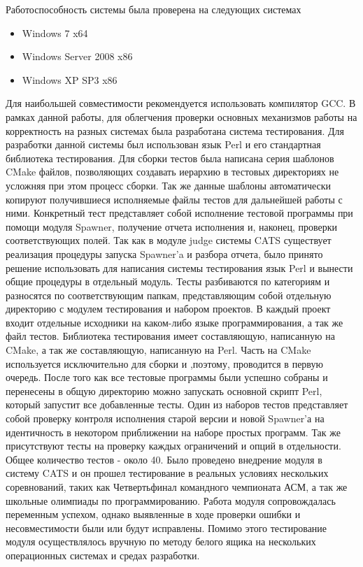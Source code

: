 \documentclass{imcs}
\begin{document}
Работоспособность системы была проверена на следующих системах
\begin{itemize}

	\item Windows 7 x64
	\item Windows Server 2008 x86
	\item Windows XP SP3 x86
\end{itemize}
Для наибольшей совместимости рекомендуется использовать компилятор GCC.
В рамках данной работы, для облегчения проверки основных механизмов работы на корректность на разных системах была разработана система тестирования.
Для разработки данной системы был использован язык Perl и его стандартная библиотека тестирования. Для сборки тестов была написана серия шаблонов CMake файлов, позволяющих создавать иерархию в тестовых директориях не усложняя при этом процесс сборки. Так же данные шаблоны автоматически копируют получившиеся исполняемые файлы тестов для дальнейшей работы с ними.
Конкретный тест представляет собой исполнение тестовой программы при помощи модуля Spawner, получение отчета исполнения и, наконец, проверки соответствующих полей. Так как в модуле judge системы CATS существует реализация процедуры запуска Spawner'a и разбора отчета, было принято решение использовать для написания системы тестирования язык Perl и вынести общие процедуры в отдельный модуль.
Тесты разбиваются по категориям и разносятся по соответствующим папкам, представляющим собой отдельную директорию с модулем тестирования и набором проектов. В каждый проект входит отдельные исходники на каком-либо языке программирования, а так же файл тестов. Библиотека тестирования имеет составляющую, написанную на CMake, а так же составляющую, написанную на Perl. Часть на CMake используется исключительно для сборки и ,поэтому, проводится в первую очередь. После того как все тестовые программы были успешно собраны и перенесены в общую директорию можно запускать основной скрипт Perl, который запустит все добавленные тесты.
Один из наборов тестов представляет собой проверку контроля исполнения старой версии и новой Spawner'а на идентичность в некотором приближении на наборе простых программ.
Так же присутствуют тесты на проверку каждых ограничений и опций в отдельности.
Общее количество тестов - около 40. 
Было проведено внедрение модуля в систему CATS и он прошел тестирование в реальных условиях нескольких соревнований, таких как Четвертьфинал командного чемпионата АСМ, а так же школьные олимпиады по программированию. Работа модуля сопровождалась переменным успехом, однако выявленные в ходе проверки ошибки и несовместимости были или будут исправлены. Помимо этого тестирование модуля осуществлялось вручную по методу белого ящика на нескольких операционных системах и средах разработки.
\end{document}

